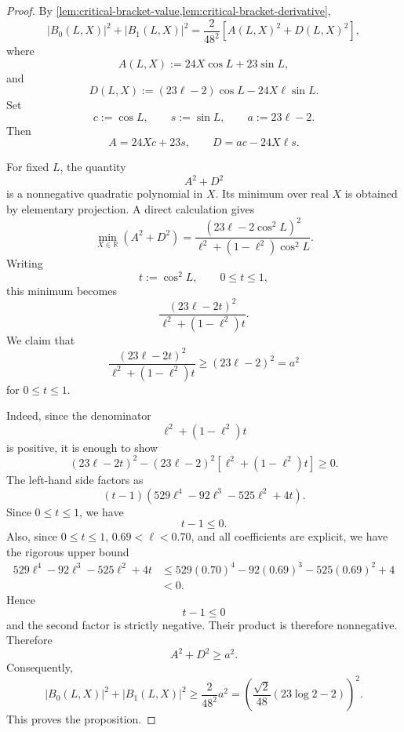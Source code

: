 \documentclass[11pt]{article}
\begin{document}
\begin{proof}
By \cref{lem:critical-bracket-value,lem:critical-bracket-derivative},
\[
        |B_0(L,X)|^2+|B_1(L,X)|^2
        =
        \frac{2}{48^2}
        \left[
        A(L,X)^2+D(L,X)^2
        \right],
\]
where
\[
        A(L,X):=24X\cos L+23\sin L,
\]
and
\[
        D(L,X):=(23\ell-2)\cos L-24X\ell\sin L.
\]
Set
\[
        c:=\cos L,
        \qquad
        s:=\sin L,
        \qquad
        a:=23\ell-2.
\]
Then
\[
        A=24Xc+23s,
        \qquad
        D=ac-24X\ell s.
\]

For fixed \(L\), the quantity
\[
        A^2+D^2
\]
is a nonnegative quadratic polynomial in \(X\).  Its minimum over real \(X\)
is obtained by elementary projection.  A direct calculation gives
\[
        \min_{X\in\mathbb R}(A^2+D^2)
        =
        \frac{(23\ell-2\cos^2 L)^2}
        {\ell^2+(1-\ell^2)\cos^2 L}.
\]
Writing
\[
        t:=\cos^2 L,
        \qquad
        0\le t\le1,
\]
this minimum becomes
\[
        \frac{(23\ell-2t)^2}{\ell^2+(1-\ell^2)t}.
\]
We claim that
\[
        \frac{(23\ell-2t)^2}{\ell^2+(1-\ell^2)t}
        \ge
        (23\ell-2)^2
        =
        a^2
\]
for \(0\le t\le1\).

Indeed, since the denominator
\[
        \ell^2+(1-\ell^2)t
\]
is positive, it is enough to show
\[
        (23\ell-2t)^2
        -
        (23\ell-2)^2
        \left[
        \ell^2+(1-\ell^2)t
        \right]
        \ge0.
\]
The left-hand side factors as
\[
        (t-1)
        \left(
        529\ell^4
        -
        92\ell^3
        -
        525\ell^2
        +
        4t
        \right).
\]
Since \(0\le t\le1\), we have
\[
        t-1\le0.
\]
Also, since \(0\le t\le1\), \(0.69<\ell<0.70\), and all coefficients are
explicit, we have the rigorous upper bound
\[
\begin{aligned}
        529\ell^4
        -
        92\ell^3
        -
        525\ell^2
        +
        4t
        &\le
        529(0.70)^4
        -
        92(0.69)^3
        -
        525(0.69)^2
        +
        4
\\
        &<
        0.
\end{aligned}
\]
Hence
\[
        t-1\le0
\]
and the second factor is strictly negative.  Their product is therefore
nonnegative.  Therefore
\[
        A^2+D^2\ge a^2.
\]
Consequently,
\[
        |B_0(L,X)|^2+|B_1(L,X)|^2
        \ge
        \frac{2}{48^2}a^2
        =
        \left(
        \frac{\sqrt2}{48}(23\log2-2)
        \right)^2.
\]
This proves the proposition.
\end{proof}
\end{document}

